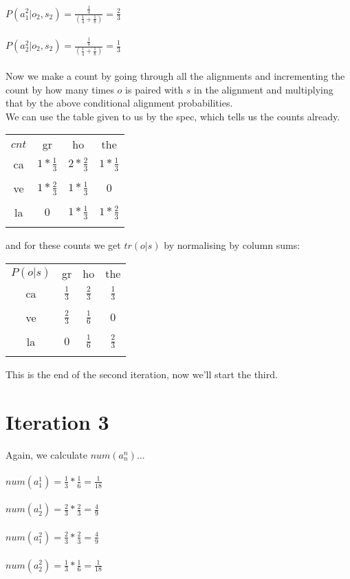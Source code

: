 \documentclass[12pt]{report}
\begin{document}
$P(a^2_1|o_2,s_2) = \frac{\frac{1}{4}}{(\frac{1}{4} + \frac{1}{8})} = \frac{2}{3}$\\\\

$P(a^2_2|o_2,s_2) = \frac{\frac{1}{8}}{(\frac{1}{4} + \frac{1}{8})} = \frac{1}{3}$\\\\

Now we make a count by going through all the alignments and incrementing the count by how many times $o$ is paired with $s$ in the alignment and multiplying that by the above conditional alignment probabilities.\\
We can use the table given to us by the spec, which tells us the counts already. 
\begin{center}
\begin{tabular}{c c c c}
$cnt$ & gr & ho & the \\
ca & $1*\frac{1}{3}$ & $2*\frac{2}{3}$ & $1*\frac{1}{3}$ \\\\
ve & $1*\frac{2}{3}$ & $1*\frac{1}{3}$ & $0$ \\\\
la & $0$ & $1*\frac{1}{3}$ & $1*\frac{2}{3}$ \\\\
\end{tabular}
\end{center}
and for these counts we get $tr(o|s)$ by normalising by column sums:
\begin{center}
\begin{tabular}{c c c c}
$P(o|s)$ & gr & ho & the \\
ca & $\frac{1}{3}$ & $\frac{2}{3}$ & $\frac{1}{3}$ \\\\
ve & $\frac{2}{3}$ & $\frac{1}{6}$ & $0$ \\\\
la & $0$ & $\frac{1}{6}$ & $\frac{2}{3}$ \\\\
\end{tabular}
\end{center}
This is the end of the second iteration, now we'll start the third.

\section{Iteration 3}
Again, we calculate $num(a^n_n)$...\\\\
$num(a^1_1) = \frac{1}{3} * \frac{1}{6} = \frac{1}{18}$\\\\
$num(a^1_2) = \frac{2}{3} * \frac{2}{3} = \frac{4}{9}$\\\\
$num(a^2_1) = \frac{2}{3} * \frac{2}{3} = \frac{4}{9}$\\\\
$num(a^2_2) = \frac{1}{3} * \frac{1}{6} = \frac{1}{18}$\\\\
\end{document}
